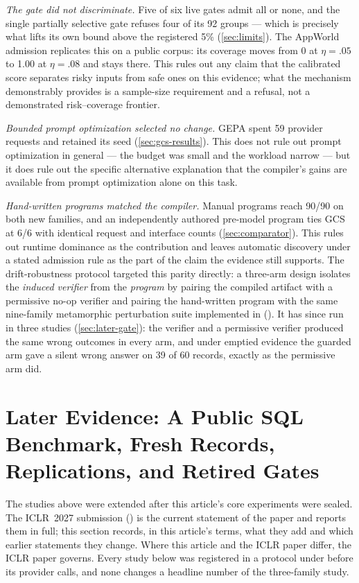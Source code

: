 \emph{The gate did not discriminate.} Five of six live gates admit all or none, and the
single partially selective gate refuses four of its 92 groups --- which is precisely what
lifts its own bound above the registered 5\% (\cref{sec:limits}).  The AppWorld admission
replicates this on a public corpus: its coverage moves from 0 at $\eta=.05$ to 1.00 at
$\eta=.08$ and stays there.  This rules out any claim that the calibrated score separates
risky inputs from safe ones on this evidence; what the mechanism demonstrably provides is a
sample-size requirement and a refusal, not a demonstrated risk--coverage frontier.

\emph{Bounded prompt optimization selected no change.} GEPA spent 59 provider requests and
retained its seed (\cref{sec:gcs-results}).  This does not rule out prompt optimization in
general --- the budget was small and the workload narrow --- but it does rule out the
specific alternative explanation that the compiler's gains are available from prompt
optimization alone on this task.

\emph{Hand-written programs matched the compiler.} Manual programs reach 90/90 on both new
families, and an independently authored pre-model program ties GCS at 6/6 with identical
request and interface counts (\cref{sec:comparator}).  This rules out runtime dominance as
the contribution and leaves automatic discovery under a stated admission rule as the part
of the claim the evidence still supports.  The drift-robustness protocol
targeted this parity directly: a three-arm design isolates the \emph{induced verifier}
from the \emph{program} by pairing the compiled artifact with a permissive no-op
verifier and pairing the hand-written program with the same nine-family metamorphic
perturbation suite implemented in 
().  It has since run in
three studies (\cref{sec:later-gate}): the verifier and a permissive verifier produced
the same wrong outcomes in every arm, and under emptied evidence the guarded arm gave a
silent wrong answer on 39 of 60 records, exactly as the permissive arm did.

\section{Later Evidence: A Public SQL Benchmark, Fresh Records, Replications, and Retired Gates}
\label{sec:later}

The studies above were extended after this article's core experiments were sealed. The
ICLR~2027 submission () is the current statement of the paper and reports
them in full; this section records, in this article's terms, what they add and which
earlier statements they change. Where this article and the ICLR paper differ, the ICLR
paper governs. Every study below was registered in a protocol under
 before its provider calls, and none changes a headline number
of the three-family study.

